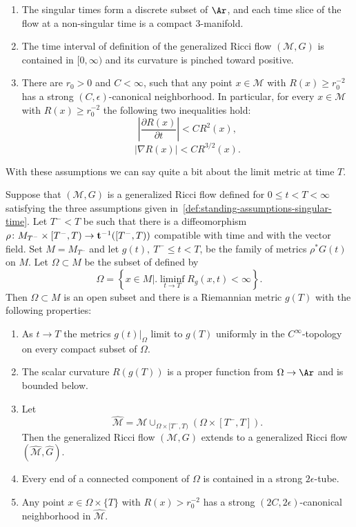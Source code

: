 \begin{definition}
\label{def:standing-assumptions-singular-time}
\label{assumptions}


\begin{enumerate}
\item[(a)] The singular times form a discrete subset of $\Ar$, and
each time slice of the flow at a non-singular time is a compact
$3$-manifold. \item[(b)] The time interval of definition of the
generalized Ricci flow $({\mathcal M},G)$ is contained in
$[0,\infty)$ and its curvature is pinched toward positive.
\item[(c)] There are $r_0>0$ and $C<\infty$, such that any point
$x\in {\mathcal M}$ with $R(x)\ge r_0^{-2}$ has a strong
$(C,\epsilon)$-canonical neighborhood. In particular, for every
$x\in {\mathcal M}$  with $R(x)\ge r_0^{-2}$ the following two
inequalities hold:
$$\left|\frac{\partial R(x)}{\partial t}\right|< CR^2(x),$$
$$|\nabla R(x)|< CR^{3/2}(x).$$
\end{enumerate}
\end{definition}
With these assumptions we can say quite a bit about the limit metric
at time $T$.

\begin{theorem}
\label{thm:singular-time-limit-properties}
\label{omega}
Suppose that $({\mathcal M},G)$ is a generalized Ricci flow defined
for $0\le t<T<\infty$ satisfying the three assumptions given
in~\ref{def:standing-assumptions-singular-time}. Let $T^-<T$ be such that there is a
diffeomorphism $\rho\colon M_{T^-}\times [T^-,T)\to {\bf
t}^{-1}([T^-,T))$ compatible with time and with the vector field.
Set $M=M_{T^-}$ and let $g(t),\ T^-\le t<T$, be the family of
metrics $\rho^*G(t)$ on $M$. Let $\Omega\subset
M$ be the subset of defined by
$$\Omega=\left\{x\in M\bigl|\bigr. \liminf_{t\rightarrow T}R_g(x,t)<\infty\right\}.$$
Then $\Omega\subset M$ is an open subset and there is a Riemannian
metric $g(T)$ with the following properties:
\begin{enumerate}
\item[(1)] As $t\rightarrow T$ the metrics $g(t)|_\Omega$ limit to $g(T)$
 uniformly in the $C^\infty$-topology
on every compact subset of $\Omega$.
\item[(2)] The scalar curvature $R(g(T))$ is a proper function from
$\Omega\to \Ar$ and is bounded below.
\item[(3)] Let
$$\widehat{\mathcal M} = {\mathcal M}\cup_{\Omega\times [T^-,T)}\left(\Omega\times [T^-,T]\right).$$
Then the generalized Ricci flow $({\mathcal M},G)$ extends to a
generalized Ricci flow  $(\widehat {\mathcal M},\widehat G)$.
\item[(4)] Every end of a connected component of
$\Omega$ is contained in a strong
$2\epsilon$-tube.
\item[(5)] Any point $x\in \Omega\times\{T\}$ with $R(x)>r_0^{-2}$
has a strong $(2C,2\epsilon)$-canonical neighborhood in $\widehat{\mathcal M}$.
\end{enumerate}
\end{theorem}

